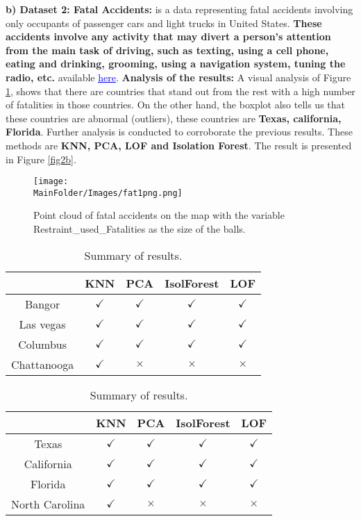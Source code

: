 \noindent \textbf{b) Dataset 2: Fatal Accidents:}
 is a data representing fatal accidents involving only occupants of passenger cars and light trucks in  United States. \textbf{These accidents involve any activity that may divert a person's attention from the main task of driving, such as texting, using a cell phone, eating and drinking, grooming, using a navigation system, tuning the radio, etc.} available  \href{https://www.bts.dot.gov/content/passenger-car-and-light-truck-occupants-killed-and-restraint-use}{\textcolor{blue}{\underline{here}}}. \newl
\noindent \textbf{Analysis of the results:}
A visual analysis of Figure \ref{fig2}, shows that there are countries that stand out from the rest with a high number of fatalities in those countries. On the other hand, the boxplot  also tells us that these countries are abnormal (outliers), these countries are \textbf{Texas, california, Florida}. Further analysis is conducted to corroborate the previous results. These methods are \textbf{ KNN, PCA, LOF and Isolation Forest}. The result is presented in Figure \ref{fig2b}. 
\begin{figure}
    \centering
    \texttt{[image: \\MainFolder/Images/fat1png.png]}
    \caption{Point cloud of fatal accidents on the map with the variable Restraint\_used\_Fatalities as the size of the balls.}%
    \label{fig2}
\end{figure}
%
%
\begin{table}
\centering
 \begin{tabular}{||c c c c c||} 
 \hline
 &  KNN & PCA & IsolForest & LOF\\ [0.5ex] 
 \hline\hline
Bangor & $\checkmark$ & $\checkmark$  & $\checkmark$ & $\checkmark$ \\ 
 Las vegas & $\checkmark$ & $\checkmark$  & $\checkmark$ & $\checkmark$ \\
Columbus & $\checkmark$ & $\checkmark$  & $\checkmark$ & $\checkmark$ \\
 Chattanooga & $\checkmark$ & $\times$  & $\times$ & $\times$ \\ [1ex] 
 \hline
 \end{tabular}
 \caption{Summary of results.}
 \label{fig2w}
\end{table}
\begin{table}
\centering
 \begin{tabular}{||c c c c c||} 
 \hline
 &  KNN & PCA & IsolForest & LOF\\ [0.5ex] 
 \hline\hline
Texas & $\checkmark$ & $\checkmark$  & $\checkmark$ & $\checkmark$ \\ 
 California & $\checkmark$ & $\checkmark$  & $\checkmark$ & $\checkmark$ \\
Florida & $\checkmark$ & $\checkmark$  & $\checkmark$ & $\checkmark$ \\
 North Carolina & $\checkmark$ & $\times$  & $\times$ & $\times$ \\ [1ex] 
 \hline
 \end{tabular}
 \caption{Summary of results.}
\end{table}

